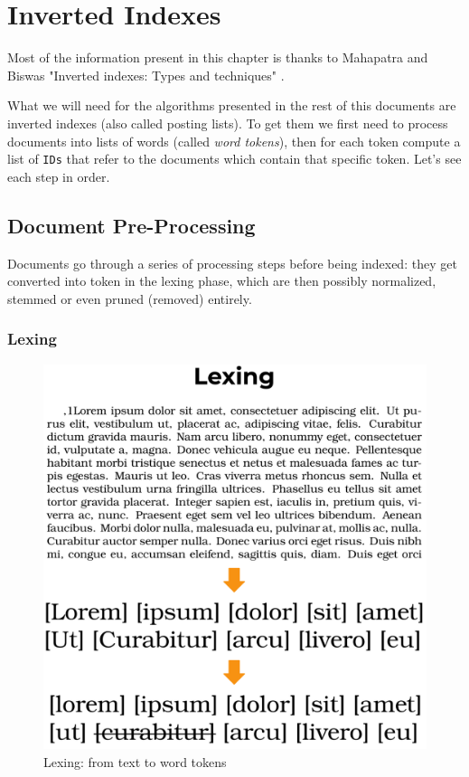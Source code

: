 \chapter{Inverted Indexes\label{invindex}}

Most of the information present in this chapter is thanks to Mahapatra and Biswas "Inverted indexes: Types and techniques" \citep{fromDocToIndex}. 

What we will need for the algorithms presented in the rest of this documents are inverted indexes (also called posting lists). To get them we first need to process documents into lists of words (called \textit{word tokens}), then for each token compute a list of \verb+IDs+ that refer to the documents which contain that specific token. Let's see each step in order.

\section{Document Pre-Processing}

Documents go through a series of processing steps before being indexed: they get converted into token in the lexing phase, which are then possibly normalized, stemmed or even pruned (removed) entirely.

\subsection{Lexing}

\begin{figure} %
    \centering
    \includegraphics[width=.5\textwidth]{imgs/lorem_lexing.png}
    \caption{Lexing: from text to word tokens\label{fig:lorem_lexing}}
\end{figure}

